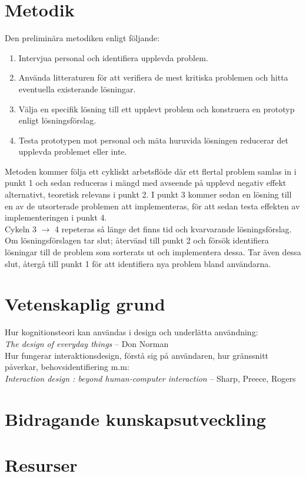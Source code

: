 \documentclass{article}
\begin{document}
\section*{Metodik}

  Den preliminära metodiken enligt följande:
  \begin{enumerate}
    \item{Intervjua personal och identifiera upplevda problem.}
    \item{Använda litteraturen för att verifiera de mest kritiska problemen och
        hitta eventuella existerande lösningar.}
    \item{Välja en specifik lösning till ett upplevt problem och konstruera en
        prototyp enligt lösningsförslag.}
    \item{Testa prototypen mot personal och mäta huruvida lösningen reducerar
        det upplevda problemet eller inte.}
  \end{enumerate}

  Metoden kommer följa ett cykliskt arbetsflöde där ett flertal problem samlas
  in i punkt 1 och sedan reduceras i mängd med avseende på upplevd negativ
  effekt alternativt, teoretisk relevans i punkt 2. I punkt 3 kommer sedan en
  lösning till en av de utsorterade problemen att implementeras, för att sedan
  testa effekten av implementeringen i punkt 4. \\

  Cykeln 3 $\rightarrow$ 4 repeteras så länge det finns tid och kvarvarande
  lösningsförslag. Om lösningsförslagen tar slut; återvänd till punkt 2 och
  försök identifiera lösningar till de problem som sorterats ut och
  implementera dessa. Tar även dessa slut, återgå till punkt 1 för att
  identifiera nya problem bland användarna.

\section*{Vetenskaplig grund}

  Hur kognitionsteori kan användas i design och underlätta användning: \\
  \textit{The design of everyday things} -- Don Norman\cite{design_norman} \\

  Hur fungerar interaktionsdesign, förstå sig på användaren, hur gränssnitt
  påverkar, behovsidentifiering m.m: \\
  \textit{Interaction design : beyond human-computer interaction } -- Sharp,
  Preece, Rogers\cite{interaction_design}

\section*{Bidragande kunskapsutveckling}

\section*{Resurser}



\end{document}
